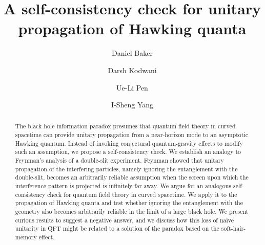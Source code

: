 \documentclass[aps,showpacs,onecolumn,floats,prd,superscriptaddress,nofootinbib]{revtex4-1}
\begin{document}
\title{A self-consistency check for unitary propagation of Hawking quanta}

\author{Daniel Baker}

\author{Darsh Kodwani}

\author{Ue-Li Pen}

\author{I-Sheng Yang}


\begin{abstract}
The black hole information paradox presumes that quantum field theory in curved spacetime can provide unitary propagation from a near-horizon mode to an asymptotic Hawking quantum. 
Instead of invoking conjectural quantum-gravity effects to modify such an assumption, we propose a self-consistency check.
We establish an analogy to Feynman's analysis of a double-slit experiment. 
Feynman showed that unitary propagation of the interfering particles, namely ignoring the entanglement with the double-slit, becomes an arbitrarily reliable assumption when the screen upon which the interference pattern is projected is infinitely far away.
We argue for an analogous self-consistency check for quantum field theory in curved spacetime.
We apply it to the propagation of Hawking quanta and test whether ignoring the entanglement with the geometry also becomes arbitrarily reliable in the limit of a large black hole. 
We present curious results to suggest a negative answer, and we discuss how this loss of na\"ive unitarity in QFT might be related to a solution of the paradox based on the soft-hair-memory effect.
\end{abstract}
\end{document}
